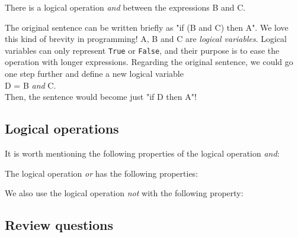 {{{{\noindent
There is a logical operation {\em and} between the expressions B and C.

The original sentence can be written briefly as "if (B and C) then A". We love this kind of 
brevity in programming! A, B and C are {\em logical variables}. Logical variables 
can only represent {\tt True} or {\tt False}, and their purpose is to ease the operation with 
longer expressions.
Regarding the original sentence, we could go one step further and define a new logical variable\\

\noindent
D = B {\em and} C.\\

\noindent
Then, the sentence would become just "if D then A"! 

\subsection{Logical operations}

It is worth mentioning the following properties of the logical operation {\em and}:\\

\begin{center}
\end{center}
\vspace{4mm}
\noindent
The logical operation {\em or} has the following properties:\\

\begin{center}
\end{center}
\vspace{4mm}
\noindent
We also use the logical operation {\em not} with the following property:\\

\begin{center}
\end{center}


\subsection{Review questions}

}}}}
